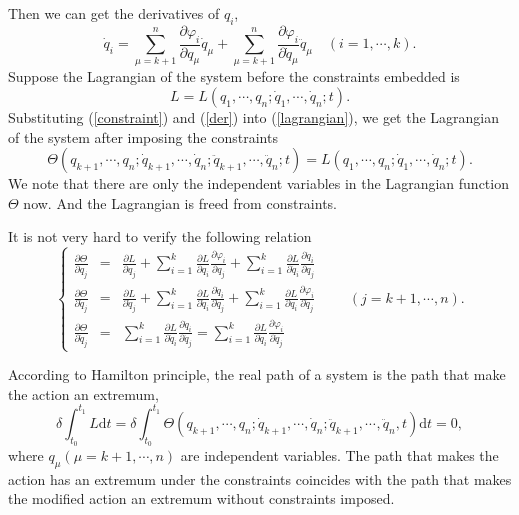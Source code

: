 \documentclass[preprint,11pt]{elsarticle}
\newcommand{\mathd}{\mathrm{d}}
\begin{document}
Then we can get the derivatives of $q_i$,
\begin{equation}
  \dot{q}_i = \sum^n_{\mu = k + 1} \frac{\partial \varphi_i}{\partial q_{\mu}}
  \dot{q}_{\mu}  + \sum^n_{\mu = k + 1} \frac{\partial
  \varphi_i}{\partial \dot{q}_{\mu}} \ddot{q}_{\mu} \hspace{1em} ( i = 1,
  \cdots, k) . \label{der}
\end{equation}
Suppose the Lagrangian of the system before the constraints embedded is
\begin{equation}
  L = L ( q_1, \cdots, q_n ; \dot{q}_1, \cdots, \dot{q}_n ; t) .
  \label{lagrangian}
\end{equation}
Substituting (\ref{constraint}) and (\ref{der}) into (\ref{lagrangian}), we
get the Lagrangian of the system after imposing the constraints
\[ \Theta ( q_{k + 1}, \cdots, q_n ; \dot{q}_{k + 1}, \cdots, \dot{q}_n ;
   \ddot{q}_{k + 1}, \cdots, \ddot{q}_n ; t) = L ( q_1, \cdots, q_n ;
   \dot{q}_1, \cdots, \dot{q}_n ; t) . \]
We note that there are only the independent variables in the Lagrangian
function $\Theta$ now. And the Lagrangian is freed from constraints.

It is not very hard to verify the following relation
\begin{equation}\label{relation}
  \left\{\begin{array}{rcl}
  \frac{\partial \Theta}{\partial q_j} &= &\frac{\partial L}{\partial q_j} +
   \sum_{i = 1}^k \frac{\partial L}{\partial q_i} \frac{\partial
   \varphi_i}{\partial q_j} + \sum_{i = 1}^k \frac{\partial L}{\partial
   \dot{q}_i} \frac{\partial \dot{q}_i}{\partial q_j} \\[6pt]
   \frac{\partial \Theta}{\partial \dot{q}_j} &= &\frac{\partial L}{\partial
   \dot{q}_j} + \sum_{i = 1}^k \frac{\partial L}{\partial \dot{q}_i}
   \frac{\partial \dot{q}_i}{\partial \dot{q}_j} + \sum_{i = 1}^k
   \frac{\partial L}{\partial q_i} \frac{\partial \varphi_i}{\partial
   \dot{q}_j} \\[6pt]
   \frac{\partial \Theta}{\partial \ddot{q}_j} &= &\sum_{i = 1}^k \frac{\partial
   L}{\partial \dot{q}_i} \frac{\partial \dot{q}_i}{\partial \ddot{q}_j} =
   \sum^k_{i = 1} \frac{\partial L}{\partial \dot{q}_i} \frac{\partial
   \varphi_i}{\partial \dot{q}_j}
  \end{array}\right.\hspace{2em}( j = k + 1, \cdots, n).
\end{equation}

According to Hamilton principle, the real path of a system is the
path that make the action an extremum,
\begin{equation}
\delta \int_{t_0}^{t_1} L \mathd t = \delta \int_{t_0}^{t_1} \Theta ( q_{k
   + 1}, \cdots, q_n ; \dot{q}_{k + 1}, \cdots, \dot{q}_n ; \ddot{q}_{k + 1},
   \cdots_{}, \ddot{q}_n, t) \mathd t = 0,
\end{equation}
where $q_{\mu}  ( \mu = k + 1, \cdots, n)$ are independent variables.
The path that makes the action has an extremum under the constraints coincides with the path that makes the
modified action an extremum without constraints imposed.
\end{document}
